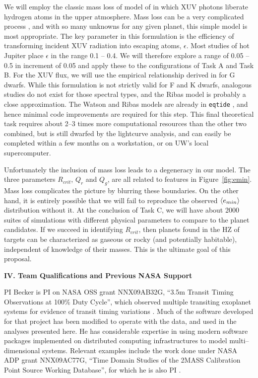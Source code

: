 We will employ the classic mass loss of model of \cite{Watson81} in
which XUV photons liberate hydrogen atoms in the upper atmosphere.
Mass loss can be a very complicated process
\citep{Yelle04,Lammer07,Khodachenko07,Leitzinger11,Lammer13}, and with
so many unknowns for any given planet, this simple model is most
appropriate.  The key parameter in this formulation is the efficiency
of transforming incident XUV radiation into escaping atoms,
$\epsilon$.  Most studies of hot Jupiter place $\epsilon$ in the range
0.1 -- 0.4.  We will therefore explore a range of 0.05 -- 0.5 in
increment of 0.05 and apply these to the configurations of Task A and
Task B.  For the XUV flux, we will use the empirical relationship
derived in \cite{Ribas05} for G dwarfs.  While this formulation is not
strictly valid for F and K dwarfs, analogous studies do not exist for
those spectral types, and the Ribas \etal model is probably a close
approximation.  The Watson and Ribas models are already in
\texttt{eqtide} \citep{Barnes13}, and hence minimal code improvements
are required for this step.  This final theoretical task requires
about 2--3 times more computational resources than the other two
combined, but is still dwarfed by the \kepler lightcurve analysis, and
can easily be completed within a few months on a workstation, or on
UW's local supercomputer.

Unfortunately the inclusion of mass loss leads to a degeneracy in our
model.  The three parameters $R_{crit}$, $Q_r$ and $Q_g$, are all
related to features in Figure~\ref{fig:emin}.  Mass loss complicates
the picture by blurring these boundaries.  On the other hand, it is
entirely possible that we will fail to reproduce the observed
$\left< e_{min} \right>$ distribution without it.  At the conclusion of Task C,
we will have about 2000 suites of simulations with different physical
parameters to compare to the
\kepler planet candidates.  If we succeed in identifying $R_{crit}$,
then planets found in the HZ of \kepler targets can be characterized
as gaseous or rocky (and potentially habitable), independent of
knowledge of their masses.  This is the ultimate goal of this
proposal.

\bigskip
\centerline{\bf IV. Team Qualifications and Previous NASA Support}
\smallskip

PI Becker is PI on NASA OSS grant NNX09AB32G, ``3.5m Transit Timing
Observations at 100\% Duty Cycle'', which observed multiple transiting
exoplanet systems for evidence of transit timing variations
\citep{2011ApJ...731..123K, 2013ApJ...764....8K, 2013ApJ...764L..17B,
  2013arXiv1304.5713K}.  Much of the software developed for that
project has been modified to operate with the \kepler data, and used in
the analyses presented here.  He has considerable expertise in using
modern software packages implemented on distributed computing
infrastructures to model multi--dimensional systems.  Relevant
examples include the work done under NASA ADP grant NNX09AC77G, ``Time
Domain Studies of the 2MASS Calibration Point Source Working
Database'', for which he is also PI
\citep{2012ApJ...748...58D,2013ApJ...764...62D}.

